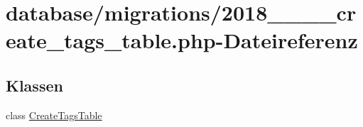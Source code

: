 \hypertarget{2018__06__12__162233__create__tags__table_8php}{}\section{database/migrations/2018\+\_\+\_\+\_\+\_\+create\+\_\+tags\+\_\+table.php-\/\+Dateireferenz}
\label{2018__06__12__162233__create__tags__table_8php}
\subsection*{Klassen}
\begin{DoxyCompactItemize}
\item 
class \hyperlink{classCreateTagsTable}{Create\+Tags\+Table}
\end{DoxyCompactItemize}

